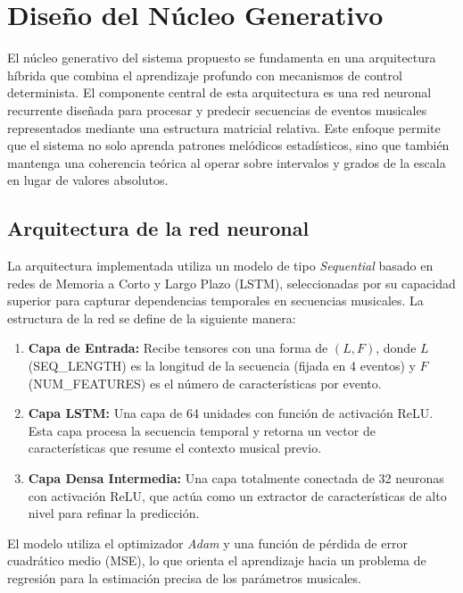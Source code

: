 \section{Diseño del Núcleo Generativo}
El núcleo generativo del sistema propuesto se fundamenta en una arquitectura híbrida que combina el aprendizaje profundo con mecanismos de control determinista. El componente central de esta arquitectura es una red neuronal recurrente diseñada para procesar y predecir secuencias de eventos musicales representados mediante una estructura matricial relativa. Este enfoque permite que el sistema no solo aprenda patrones melódicos estadísticos, sino que también mantenga una coherencia teórica al operar sobre intervalos y grados de la escala en lugar de valores absolutos.

\subsection{Arquitectura de la red neuronal}
La arquitectura implementada utiliza un modelo de tipo \textit{Sequential} basado en redes de Memoria a Corto y Largo Plazo (LSTM), seleccionadas por su capacidad superior para capturar dependencias temporales en secuencias musicales. La estructura de la red se define de la siguiente manera:

\begin{enumerate}
    \item \textbf{Capa de Entrada:} Recibe tensores con una forma de $(L, F)$, donde $L$ (SEQ\_LENGTH) es la longitud de la secuencia (fijada en 4 eventos) y $F$ (NUM\_FEATURES) es el número de características por evento.
    \item \textbf{Capa LSTM:} Una capa de 64 unidades con función de activación ReLU. Esta capa procesa la secuencia temporal y retorna un vector de características que resume el contexto musical previo.
    \item \textbf{Capa Densa Intermedia:} Una capa totalmente conectada de 32 neuronas con activación ReLU, que actúa como un extractor de características de alto nivel para refinar la predicción.
\end{enumerate}

El modelo utiliza el optimizador \textit{Adam} y una función de pérdida de error cuadrático medio (MSE), lo que orienta el aprendizaje hacia un problema de regresión para la estimación precisa de los parámetros musicales.

